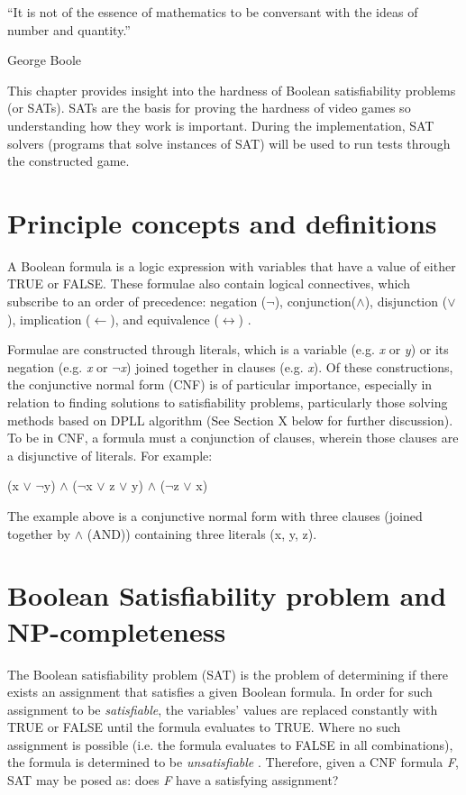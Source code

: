 \documentclass[11pt, a4paper, oneside]{report} %
\begin{document}
\epigraph{``It is not of the essence of mathematics to be conversant with the ideas of number and
quantity.''}{George Boole}


This chapter provides insight into the hardness of Boolean satisfiability problems (or SATs). SATs
are the basis for proving the hardness of video games so understanding how they work is important.
During the implementation, SAT solvers (programs that solve instances of SAT) will be used to run
tests through the constructed game.

\section{Principle concepts and definitions}

A Boolean formula is a logic expression with variables that have a value of either TRUE or FALSE.
These formulae also contain logical connectives, which subscribe to an order of precedence:
negation ($\neg$), conjunction($\wedge$), disjunction ($\vee$), implication ($\leftarrow$), and
equivalence ($\leftrightarrow$) \cite{balyo2010solving,gomes2008satisfiability}.

Formulae are constructed through literals, which is a variable (e.g. \textit{x} or \textit{y})  or
its negation (e.g. \textit{x} or $\neg$\textit{x}) joined together in clauses (e.g. \textit{x}). Of
these constructions, the conjunctive normal form (CNF) is of particular importance, especially in
relation to finding solutions to satisfiability problems, particularly those solving methods based
on DPLL algorithm \cite{gomes2008satisfiability} (See Section X below for further discussion). To be
in CNF, a formula must a conjunction of clauses, wherein those clauses are a disjunctive of
literals. For example:

\centerline{(x $\vee$ $\neg$y) $\wedge$ ($\neg$x $\vee$ z $\vee$ y) $\wedge$ ($\neg$z $\vee$ x)} 

\par  \noindent The example above is a conjunctive normal form with three clauses (joined together by $\wedge$ (AND)) containing three literals (x, y, z). 

\section{Boolean Satisfiability problem and NP-completeness}

The Boolean satisfiability problem (SAT) is the problem of determining if there exists an assignment
that satisfies a given Boolean formula. In order for such assignment to be \textit{satisfiable}, the
variables' values are replaced constantly with TRUE or FALSE until the formula evaluates to TRUE.
Where no such assignment is possible (i.e. the formula evaluates to FALSE in all combinations), the
formula is determined to be \textit{unsatisfiable} \cite{balyo2010solving,gomes2008satisfiability}.
Therefore, given a CNF formula \textit{F}, SAT may be posed as: does \textit{F} have a satisfying
assignment?
\end{document}
